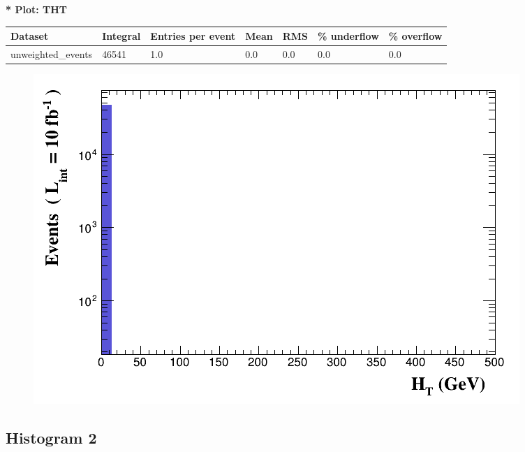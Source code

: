 \documentclass[a4paper, 10pt]{article}
\begin{document}
\textbf{* Plot: THT}\\
   \begin{table}[H]
  \begin{center}
    \begin{tabular}{|m{23.0mm}|m{23.0mm}|m{18.0mm}|m{19.0mm}|m{19.0mm}|m{19.0mm}|m{19.0mm}|}
      \hline
      {\cellcolor{yellow}         Dataset}& {\cellcolor{yellow}         Integral}& {\cellcolor{yellow}         Entries per event}& {\cellcolor{yellow}         Mean}& {\cellcolor{yellow}         RMS}& {\cellcolor{yellow}         \% underflow}& {\cellcolor{yellow}         \% overflow}\\
      \hline
      {\cellcolor{white}         unweighted\_events}& {\cellcolor{white}         46541}& {\cellcolor{white}         1.0}& {\cellcolor{white}         0.0}& {\cellcolor{white}         0.0}& {\cellcolor{green}         0.0}& {\cellcolor{green}         0.0}\\
\hline
    \end{tabular}
  \end{center}
\end{table}

\begin{figure}[H]
  \begin{center}
    \includegraphics[scale=0.45]{selection_0.png}\\
\caption{   }
  \end{center}
\end{figure}
      \newpage
\subsection{ Histogram 2}
\end{document}
